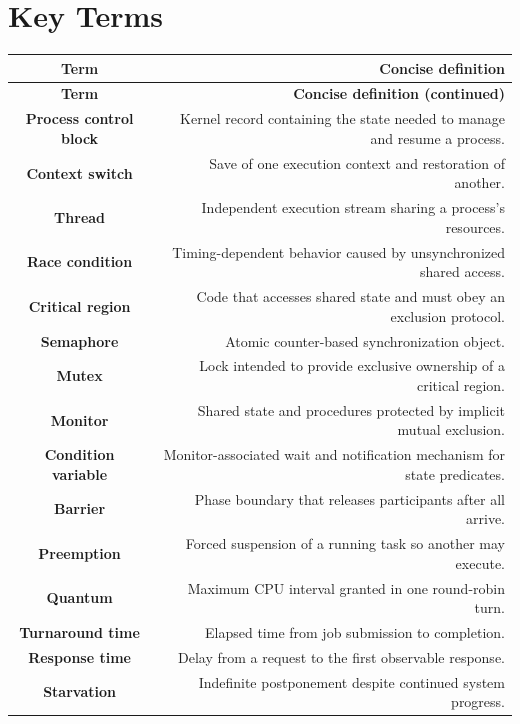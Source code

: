 \documentclass[10pt,letterpaper]{article}
\begin{document}
\section*{Key Terms}
\small
\begin{longtable}{C N}
\color{white}\textbf{Term} & \color{white}\textbf{Concise definition}\\
\endfirsthead
{}\color{white}\textbf{Term} & \color{white}\textbf{Concise definition (continued)}\\
\endhead
\textbf{Process control block} & Kernel record containing the state needed to manage and resume a process.\\\hline
\textbf{Context switch} & Save of one execution context and restoration of another.\\\hline
\textbf{Thread} & Independent execution stream sharing a process's resources.\\\hline
\textbf{Race condition} & Timing-dependent behavior caused by unsynchronized shared access.\\\hline
\textbf{Critical region} & Code that accesses shared state and must obey an exclusion protocol.\\\hline
\textbf{Semaphore} & Atomic counter-based synchronization object.\\\hline
\textbf{Mutex} & Lock intended to provide exclusive ownership of a critical region.\\\hline
\textbf{Monitor} & Shared state and procedures protected by implicit mutual exclusion.\\\hline
\textbf{Condition variable} & Monitor-associated wait and notification mechanism for state predicates.\\\hline
\textbf{Barrier} & Phase boundary that releases participants after all arrive.\\\hline
\textbf{Preemption} & Forced suspension of a running task so another may execute.\\\hline
\textbf{Quantum} & Maximum CPU interval granted in one round-robin turn.\\\hline
\textbf{Turnaround time} & Elapsed time from job submission to completion.\\\hline
\textbf{Response time} & Delay from a request to the first observable response.\\\hline
\textbf{Starvation} & Indefinite postponement despite continued system progress.\\\hline
\end{longtable}
\normalsize
\end{document}

